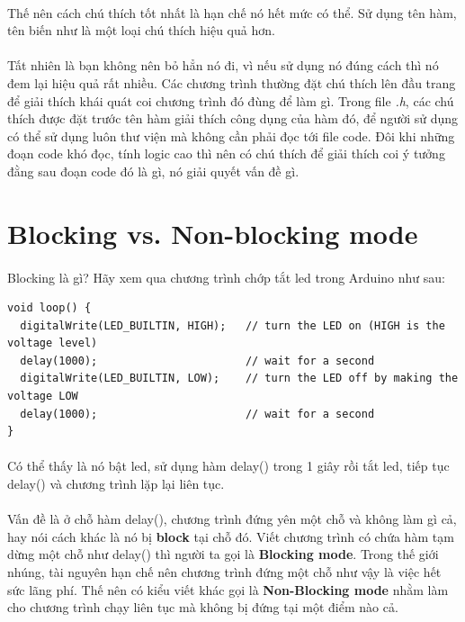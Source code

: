 \documentclass[12pt,a5paper]{book}
\begin{document}
\paragraph{}
Thế nên cách chú thích tốt nhất là hạn chế nó hết mức có thể. Sử dụng tên hàm, tên biến như là một loại chú thích hiệu quả hơn.
\paragraph{}
Tất nhiên là bạn không nên bỏ hẳn nó đi, vì nếu sử dụng nó đúng cách thì nó đem lại hiệu quả rất nhiều. Các chương trình thường đặt chú thích lên đầu trang để giải thích khái quát coi chương trình đó đùng để làm gì. Trong file \textit{.h}, các chú thích được đặt trước tên hàm giải thích công dụng của hàm đó, để người sử dụng có thể sử dụng luôn thư viện mà không cần phải đọc tới file code. Đôi khi những đoạn code khó đọc, tính logic cao thì nên có chú thích để giải thích coi ý tưởng đằng sau đoạn code đó là gì, nó giải quyết vấn đề gì.

\section{Blocking vs. Non-blocking mode}
\paragraph{}
Blocking là gì? Hãy xem qua chương trình chớp tắt led trong Arduino như sau:
\begin{lstlisting}
void loop() {
  digitalWrite(LED_BUILTIN, HIGH);   // turn the LED on (HIGH is the voltage level)
  delay(1000);                       // wait for a second
  digitalWrite(LED_BUILTIN, LOW);    // turn the LED off by making the voltage LOW
  delay(1000);                       // wait for a second
}
\end{lstlisting}
\paragraph{}
Có thể thấy là nó bật led, sử dụng hàm delay() trong 1 giây rồi tắt led, tiếp tục delay() và chương trình lặp lại liên tục.
\paragraph{}
Vấn đề là ở chỗ hàm delay(), chương trình đứng yên một chỗ và không làm gì cả, hay nói cách khác là nó bị \textbf{block} tại chỗ đó. Viết chương trình có chứa hàm tạm dừng một chỗ như delay() thì người ta gọi là \textbf{Blocking mode}. Trong thế giới nhúng, tài nguyên hạn chế nên chương trình đứng một chỗ như vậy là việc hết sức lãng phí. Thế nên có kiểu viết khác gọi là \textbf{Non-Blocking mode} nhằm làm cho chương trình chạy liên tục mà không bị đứng tại một điểm nào cả.
\end{document}

